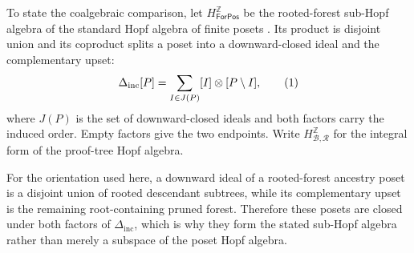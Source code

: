 \documentclass[10pt,a4paper]{article}
\theoremstyle{plain}
\theoremstyle{definition}
\theoremstyle{remark}
\newcommand{\Base}{\mathcal B}
\newcommand{\Rules}{\mathcal R}
\newcommand{\eqtag}{\refstepcounter{equation}\tag{\theequation}}
\begin{document}
To state the coalgebraic comparison, let
\(H^{\mathbb Z}_{\mathsf{ForPos}}\) be the rooted-forest sub-Hopf algebra of
the standard Hopf algebra of finite posets
\cite{aguiarbergeronsottile2006}.  Its product is disjoint union and its
coproduct splits a poset into a downward-closed ideal and the complementary
upset:
\[
 \Delta_{\mathrm{inc}}[P]
   =\sum_{I\in J(P)}[I]\otimes[P\setminus I],
\eqtag\label{eq:forest-poset-incidence-coproduct}
\]
where \(J(P)\) is the set of downward-closed ideals and both factors carry
the induced order.  Empty factors give the two endpoints.  Write
\(H^{\mathbb Z}_{\Base,\Rules}\) for the integral form of the proof-tree
Hopf algebra.

For the orientation used here, a downward ideal of a rooted-forest ancestry
poset is a disjoint union of rooted descendant subtrees, while its
complementary upset is the remaining root-containing pruned forest.
Therefore these posets are closed under both factors of
\(\Delta_{\mathrm{inc}}\), which is why they form the stated sub-Hopf
algebra rather than merely a subspace of the poset Hopf algebra.
\end{document}
